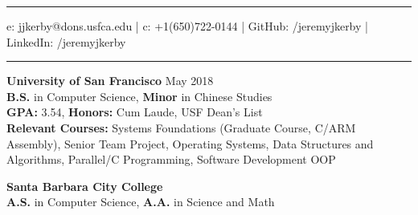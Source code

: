 \documentclass{article}
\begin{document}
\begin{center}
	\noindent{}\rule[-2pt]{\textwidth}{.5pt}
	\normalsize{e: jjkerby@dons.usfca.edu | c: +1(650)722-0144 | GitHub: /jeremyjkerby | LinkedIn: /jeremyjkerby}
\end{center}


\noindent{}\rule[-2pt]{\textwidth}{.3pt}
\noindent\large{\textbf{University of San Francisco}}
\normalsize{
	\hspace*{340pt}May 2018\\
	\hspace*{20pt}\textbf{B.S.} in Computer Science, \textbf{Minor} in Chinese Studies\\
	\hspace*{20pt}\textbf{GPA:} 3.54, \textbf{Honors:} Cum Laude, USF Dean's List\\
	\hspace*{20pt}\textbf{Relevant Courses:} Systems Foundations (Graduate Course, C/ARM Assembly), Senior Team Project, Operating Systems, Data Structures and Algorithms, Parallel/C Programming, Software Development OOP}

\noindent\large{\textbf{Santa Barbara City College}}\\
\normalsize{
	\hspace*{20pt}\textbf{A.S.} in Computer Science, \textbf{A.A.} in Science and Math\\
}
\end{document}
